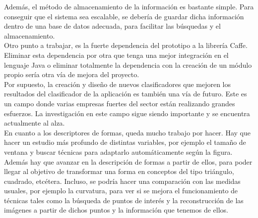 Además, el método de almacenamiento de la información es bastante simple. Para conseguir que el sistema sea escalable, se debería de guardar dicha información dentro de una base de datos adecuada, para facilitar las búsquedas y el almacenamiento.\\

Otro punto a trabajar, es la fuerte dependencia del prototipo a la librería Caffe. Eliminar esta dependencia por otra que tenga una mejor integración en el lenguaje Java o eliminar totalmente la dependencia con la creación de un módulo propio sería otra vía de mejora del proyecto.\\

Por supuesto, la creación y diseño de nuevos clasificadores que mejoren los resultados del clasificador de la aplicación es también una vía de futuro. Este es un campo donde varias empresas fuertes del sector están realizando grandes esfuerzos. La investigación en este campo sigue siendo importante y se encuentra actualmente al alza.\\

En cuanto a los descriptores de formas, queda mucho trabajo por hacer. Hay que hacer un estudio más profundo de distintas variables, por ejemplo el tamaño de ventana y buscar técnicas para adaptarlo automáticamente según la figura. Además hay que avanzar en la descripción de formas a partir de ellos, para poder llegar al objetivo de transformar una forma en conceptos del tipo triángulo, cuadrado, etcétera. Incluso, se podría hacer una comparación con las medidas usuales, por ejemplo la curvatura, para ver si se mejora el funcionamiento de técnicas tales como la búsqueda de puntos de interés y la reconstrucción de las imágenes a partir de dichos puntos y la información que tenemos de ellos.\\
